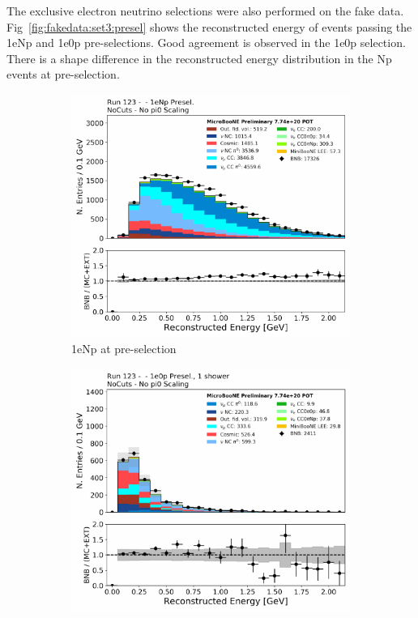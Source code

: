 The exclusive electron neutrino selections were also performed on the fake data. Fig~\ref{fig:fakedata:set3:presel} shows the reconstructed energy of events passing the 1eNp and 1e0p pre-selections.  Good agreement is observed in the 1e0p selection.  There is a shape difference in the reconstructed energy distribution in the Np events at pre-selection.

\begin{figure}[H] 
\begin{center}
    \begin{subfigure}[b]{0.45\textwidth}
    \centering
    \includegraphics[width=1.00\textwidth]{Fakedata/set3/Np_presel_recoe.pdf}
    \caption{\label{fig:fakedata:set3:Np_presel_recoe} 1eNp at pre-selection}
    \end{subfigure}
    \begin{subfigure}[b]{0.45\textwidth}
    \centering
    \includegraphics[width=1.00\textwidth]{Fakedata/set3/zp_presel_recoe.pdf}

\end{subfigure}
\end{center}
\end{figure}
